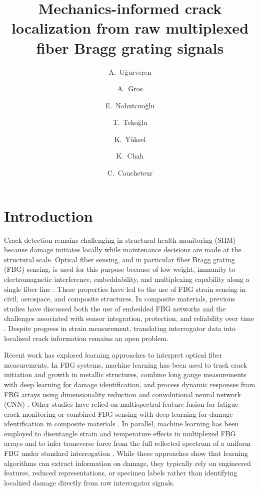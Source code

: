 \documentclass[fleqn,10pt]{wlscirep}
\title{Mechanics-informed crack localization from raw multiplexed fiber Bragg grating signals}
\author[a,c]{A.~Uğurveren}
\author[a]{A.~Gros}
\author[a,c]{E.~Nohutcuoğlu}
\author[a,c]{T.~Tekoğlu}
\author[c]{K.~Yüksel}
\author[a]{K.~Chah}
\author[a,b,*]{C.~Caucheteur}
\affil[a]{Electromagnetism and Telecommunication Department, UMONS, Mons, 7000, Belgium}
\affil[b]{WEL Research Institute, Avenue Pasteur, 6, 1300 Wavre, Belgium}
\affil[c]{FISENS, Izmir Institute of Technology, Urla, 35430, Türkiye}
\affil[*]{christophe.caucheteur@umons.ac.be}
\begin{document}
\flushbottom
\maketitle
\thispagestyle{empty}

\section*{Introduction}

Crack detection remains challenging in structural health monitoring (SHM) because damage initiates locally while maintenance decisions are made at the structural scale. Optical fiber sensing, and in particular fiber Bragg grating (FBG) sensing, is used for this purpose because of low weight, immunity to electromagnetic interference, embeddability, and multiplexing capability along a single fiber line \cite{ye2014,yassin2024,golovastikov2025}. These properties have led to the use of FBG strain sensing in civil, aerospace, and composite structures. In composite materials, previous studies have discussed both the use of embedded FBG networks and the challenges associated with sensor integration, protection, and reliability over time \cite{kinet2014,gabardi2023}. Despite progress in strain measurement, translating interrogator data into localized crack information remains an open problem.

Recent work has explored learning approaches to interpret optical fiber measurements. In FBG systems, machine learning has been used to track crack initiation and growth in metallic structures, combine long gauge measurements with deep learning for damage identification, and process dynamic responses from FBG arrays using dimensionality reduction and convolutional neural network (CNN) \cite{chilelli2019,zhang2020,wang2023}. Other studies have relied on multispectral feature fusion for fatigue crack monitoring or combined FBG sensing with deep learning for damage identification in composite materials \cite{zhao2025,xiong2025}. In parallel, machine learning has been employed to disentangle strain and temperature effects in multiplexed FBG arrays \cite{saha2025} and to infer transverse force from the full reflected spectrum of a uniform FBG under standard interrogation \cite{tocanne2025}.  While these approaches show that learning algorithms can extract information on damage, they typically rely on engineered features, reduced representations, or specimen labels rather than identifying localized damage directly from raw interrogator signals.
\end{document}

